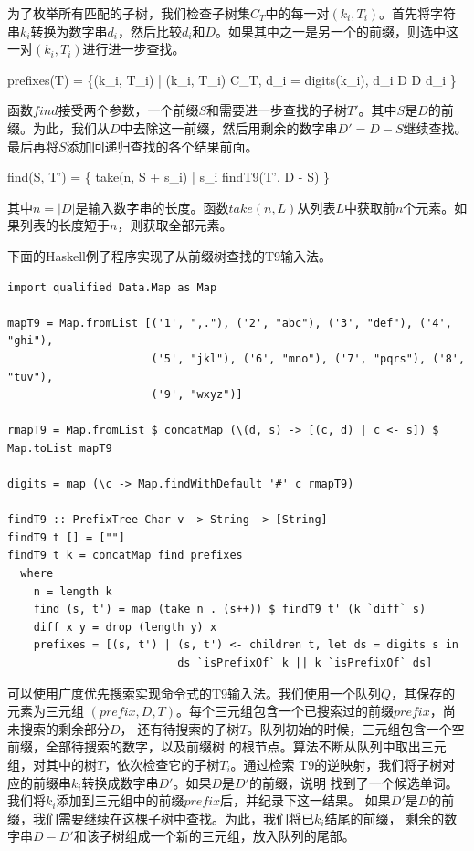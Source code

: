 \documentclass[b5paper]{ctexart}
\begin{document}
为了枚举所有匹配的子树，我们检查子树集$C_T$中的每一对$(k_i, T_i)$。首先将字符串$k_i$转换为数字串$d_i$，然后比较$d_i$和$D$。如果其中之一是另一个的前缀，则选中这一对$(k_i, T_i)$进行进一步查找。

\be
prefixes(T) = \{(k_i, T_i) | (k_i, T_i) \in C_T, d_i = digits(k_i), d_i \sqsubset D \lor D \sqsubset d_i \}
\ee

函数$find$接受两个参数，一个前缀$S$和需要进一步查找的子树$T'$。其中$S$是$D$的前缀。为此，我们从$D$中去除这一前缀，然后用剩余的数字串$D' = D - S$继续查找。最后再将$S$添加回递归查找的各个结果前面。

\be
find(S, T') = \{ take(n, S + s_i) | s_i \in findT9(T', D - S) \}
\ee

其中$n = |D|$是输入数字串的长度。函数$take(n, L)$从列表$L$中获取前$n$个元素。如果列表的长度短于$n$，则获取全部元素。

下面的Haskell例子程序实现了从前缀树查找的T9输入法。

\lstset{language=Haskell}
\begin{lstlisting}
import qualified Data.Map as Map

mapT9 = Map.fromList [('1', ",."), ('2', "abc"), ('3', "def"), ('4', "ghi"),
                      ('5', "jkl"), ('6', "mno"), ('7', "pqrs"), ('8', "tuv"),
                      ('9', "wxyz")]

rmapT9 = Map.fromList $ concatMap (\(d, s) -> [(c, d) | c <- s]) $ Map.toList mapT9

digits = map (\c -> Map.findWithDefault '#' c rmapT9)

findT9 :: PrefixTree Char v -> String -> [String]
findT9 t [] = [""]
findT9 t k = concatMap find prefixes
  where
    n = length k
    find (s, t') = map (take n . (s++)) $ findT9 t' (k `diff` s)
    diff x y = drop (length y) x
    prefixes = [(s, t') | (s, t') <- children t, let ds = digits s in
                          ds `isPrefixOf` k || k `isPrefixOf` ds]
\end{lstlisting}  %

可以使用广度优先搜索实现命令式的T9输入法。我们使用一个队列$Q$，其保存的元素为三元组
$(prefix, D, T)$。每个三元组包含一个已搜索过的前缀$prefix$，尚未搜索的剩余部分$D$，
还有待搜索的子树$T$。队列初始的时候，三元组包含一个空前缀，全部待搜索的数字，以及前缀树
的根节点。算法不断从队列中取出三元组，对其中的树$T$，依次检查它的子树$T_i$。通过检索
T9的逆映射，我们将子树对应的前缀串$k_i$转换成数字串$D'$。如果$D$是$D'$的前缀，说明
找到了一个候选单词。我们将$k_i$添加到三元组中的前缀$prefix$后，并纪录下这一结果。
如果$D'$是$D$的前缀，我们需要继续在这棵子树中查找。为此，我们将已$k_i$结尾的前缀，
剩余的数字串$D-D'$和该子树组成一个新的三元组，放入队列的尾部。
\end{document}
